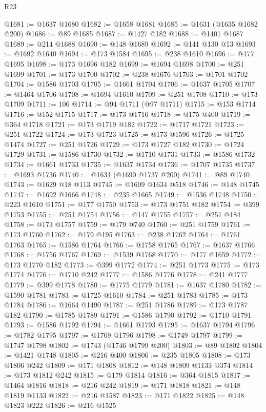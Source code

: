 \begin{lexlean}{R23}
\begin{coremodule}
@1681 := @1637 @1680
@1682 := @1658 @1681
@1685 := @1631 (@1635 @1682 @200)
@1686 := @89 @1685
@1687 := @1427 @182
@1688 := @1401 @1687
@1689 := @214 @1688
@1690 := @148 @1689
@1692 := @141 @130 @13
@1693 := @1692 @1640
@1694 := @173 @1584
@1695 := @238 @1610
@1696 := @177 @1695
@1698 := @173 @1696 @182
@1699 := @1694 @1698
@1700 := @251 @1699
@1701 := @173 @1700
@1702 := @238 @1676
@1703 := @1701 @1702
@1704 := @1586 @1703
@1705 := @1661 @1704
@1706 := @1637 @1705
@1707 := @1464 @1706
@1708 := @1694 @1610
@1709 := @251 @1708
@1710 := @173 @1709
@1711 := 106
@1714 := @94 @1711 (@97 @1711)
@1715 := @153 @1714
@1716 := @152 @1715
@1717 := @173 @1716
@1718 := @175 @400
@1719 := @364 @1718
@1721 := @173 @1719 @182
@1722 := @1717 @1721
@1723 := @251 @1722
@1724 := @173 @1723
@1725 := @173 @1596
@1726 := @1725 @1474
@1727 := @251 @1726
@1729 := @173 @1727 @182
@1730 := @1724 @1729
@1731 := @1586 @1730
@1732 := @1710 @1731
@1733 := @1586 @1732
@1734 := @1661 @1733
@1735 := @1637 @1734
@1736 := @1707 @1735
@1737 := @1693 @1736
@1740 := @1631 (@1690 @1737 @200)
@1741 := @89 @1740
@1743 := @1629 @18 @113
@1745 := @1609 @1634 @518
@1746 := @148 @1745
@1747 := @1692 @1666
@1748 := @235 @1665
@1749 := @1536 @1748
@1750 := @223 @1610
@1751 := @177 @1750
@1753 := @173 @1751 @182
@1754 := @399 @1753
@1755 := @251 @1754
@1756 := @147 @1755
@1757 := @251 @184
@1758 := @173 @1757
@1759 := @179 @740
@1760 := @251 @1759
@1761 := @173 @1760
@1762 := @179 @195
@1763 := @238 @1762
@1764 := @1761 @1763
@1765 := @1586 @1764
@1766 := @1758 @1765
@1767 := @1637 @1766
@1768 := @1756 @1767
@1769 := @1539 @1768
@1770 := @177 @1659
@1772 := @173 @1770 @182
@1773 := @399 @1772
@1774 := @251 @1773
@1775 := @173 @1774
@1776 := @1710 @242
@1777 := @1586 @1776
@1778 := @241 @1777
@1779 := @399 @1778
@1780 := @1775 @1779
@1781 := @1637 @1780
@1782 := @1590 @1781
@1783 := @1725 @1610
@1784 := @251 @1783
@1785 := @173 @1784
@1786 := @1664 @1490
@1787 := @251 @1786
@1789 := @173 @1787 @182
@1790 := @1785 @1789
@1791 := @1586 @1790
@1792 := @1710 @1791
@1793 := @1586 @1792
@1794 := @1661 @1793
@1795 := @1637 @1794
@1796 := @1782 @1795
@1797 := @1769 @1796
@1798 := @1749 @1797
@1799 := @1747 @1798
@1802 := @1743 (@1746 @1799 @200)
@1803 := @89 @1802
@1804 := @1421 @1748
@1805 := @216 @400
@1806 := @235 @1805
@1808 := @173 @1806 @242
@1809 := @171 @1808
@1812 := @148 @1809 @1133 @374
@1814 := @173 @1812 @242
@1815 := @179 @1814
@1816 := @364 @1815
@1817 := @1464 @1816
@1818 := @216 @242
@1819 := @171 @1818
@1821 := @148 @1819 @1133
@1822 := @216 @1587
@1823 := @171 @1822
@1825 := @148 @1823 @222
@1826 := @216 @1525

\end{coremodule}
\end{lexlean}

